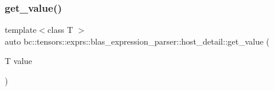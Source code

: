 \subsubsection{\texorpdfstring{get\+\_\+value()}{get\_value()}}
{\footnotesize\ttfamily template$<$class T $>$ \\
auto bc\+::tensors\+::exprs\+::blas\+\_\+expression\+\_\+parser\+::host\+\_\+detail\+::get\+\_\+value (\begin{DoxyParamCaption}\item[{T}]{value }\end{DoxyParamCaption})}

